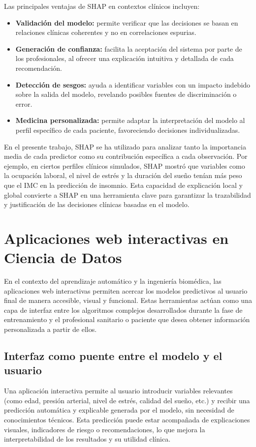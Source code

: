 Las principales ventajas de SHAP en contextos clínicos incluyen:

\begin{itemize}
  \item \textbf{Validación del modelo:} permite verificar que las decisiones se basan en relaciones clínicas coherentes y no en correlaciones espurias.
  \item \textbf{Generación de confianza:} facilita la aceptación del sistema por parte de los profesionales, al ofrecer una explicación intuitiva y detallada de cada recomendación.
  \item \textbf{Detección de sesgos:} ayuda a identificar variables con un impacto indebido sobre la salida del modelo, revelando posibles fuentes de discriminación o error.
  \item \textbf{Medicina personalizada:} permite adaptar la interpretación del modelo al perfil específico de cada paciente, favoreciendo decisiones individualizadas.
\end{itemize}

En el presente trabajo, SHAP se ha utilizado para analizar tanto la importancia media de cada predictor como su contribución específica a cada observación. Por ejemplo, en ciertos perfiles clínicos simulados, SHAP mostró que variables como la ocupación laboral, el nivel de estrés y la duración del sueño tenían más peso que el IMC en la predicción de insomnio. Esta capacidad de explicación local y global convierte a SHAP en una herramienta clave para garantizar la trazabilidad y justificación de las decisiones clínicas basadas en el modelo.


\section{Aplicaciones web interactivas en Ciencia de Datos}
En el contexto del aprendizaje automático y la ingeniería biomédica, las aplicaciones web interactivas permiten acercar los modelos predictivos al usuario final de manera accesible, visual y funcional. Estas herramientas actúan como una capa de interfaz entre los algoritmos complejos desarrollados durante la fase de entrenamiento y el profesional sanitario o paciente que desea obtener información personalizada a partir de ellos.

\subsection{Interfaz como puente entre el modelo y el usuario}
Una aplicación interactiva permite al usuario introducir variables relevantes (como edad, presión arterial, nivel de estrés, calidad del sueño, etc.) y recibir una predicción automática y explicable generada por el modelo, sin necesidad de conocimientos técnicos. Esta predicción puede estar acompañada de explicaciones visuales, indicadores de riesgo o recomendaciones, lo que mejora la interpretabilidad de los resultados y su utilidad clínica.

